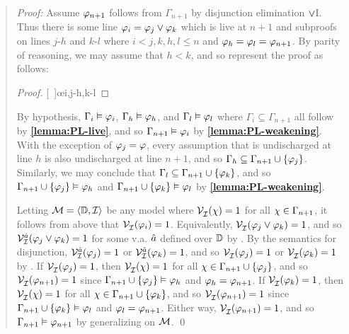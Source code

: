 \begin{quote} 
  \textit{Proof:} Assume $\varphi_{n+1}$ follows from $\Gamma_{n+1}$ by disjunction elimination $\vee$I.
  Thus there is some line $\varphi_i=\varphi_j\vee\varphi_k$ which is live at $n+1$ and subproofs on lines $j$-$h$ and $k$-$l$ where $i<j,k,h,l\leq n$ and $\varphi_h=\varphi_l=\varphi_{n+1}$.
  By parity of reasoning, we may assume that $h<k$, and so represent the proof as follows:

  \begin{proof}
  \open
     
  \close
  \open
     
  \close
  [\ ]{\metaC}\oe{i,j-h,k-l} 
  \end{proof}

  By hypothesis, $\Gamma_i\vDash \varphi_i$, $\Gamma_h\vDash \varphi_h$, and $\Gamma_l\vDash \varphi_l$ where $\Gamma_i\subseteq \Gamma_{n+1}$ all follow by \textbf{\ref{lemma:PL-live}}, and so $\Gamma_{n+1} \vDash \varphi_i$ by \textbf{\ref{lemma:PL-weakening}}.
  With the exception of $\varphi_j=\varphi$, every assumption that is undischarged at line $h$ is also undischarged at line $n+1$, and so $\Gamma_h\subseteq\Gamma_{n+1}\cup\lbrace\varphi_j\rbrace$.
  Similarly, we may conclude that $\Gamma_l\subseteq\Gamma_{n+1}\cup\lbrace\varphi_k\rbrace$, and so $\Gamma_{n+1}\cup\lbrace\varphi_j\rbrace \vDash \varphi_h$ and $\Gamma_{n+1}\cup\lbrace\varphi_k\rbrace \vDash \varphi_l$ by \textbf{\ref{lemma:PL-weakening}}.


  Letting $\mathcal{M}=\langle\mathbb{D},\mathcal{I}\rangle$ be any model where $\mathcal{V}_{\mathcal{I}}^{}(\chi) = 1$ for all $\chi \in \Gamma_{n+1}$, it follows from above that $\mathcal{V}_{\mathcal{I}}^{}(\varphi_i) = 1$.
  Equivalently, $\mathcal{V}_{\mathcal{I}}^{}(\varphi_j \vee \varphi_k) = 1$, and so $\mathcal{V}_{\mathcal{I}}^{\hat{a}}(\varphi_j\vee\varphi_k)=1$ for some v.a. $\hat{a}$ defined over $\mathbb{D}$ by .
  By the semantics for disjunction, $\mathcal{V}_{\mathcal{I}}^{\hat{a}}(\varphi_j)=1$ or $\mathcal{V}_{\mathcal{I}}^{\hat{a}}(\varphi_k)=1$, and so $\mathcal{V}_{\mathcal{I}}^{}(\varphi_j)=1$ or $\mathcal{V}_{\mathcal{I}}^{}(\varphi_k)=1$ by .
  If $\mathcal{V}_{\mathcal{I}}^{}(\varphi_j)=1$, then $\mathcal{V}_{\mathcal{I}}^{}(\chi)=1$ for all $\chi \in \Gamma_{n+1}\cup\lbrace\varphi_j\rbrace$, and so $\mathcal{V}_{\mathcal{I}}^{}(\varphi_{n+1})=1$ since $\Gamma_{n+1}\cup\lbrace\varphi_j\rbrace \vDash \varphi_h$ and $\varphi_h=\varphi_{n+1}$. 
  If $\mathcal{V}_{\mathcal{I}}^{}(\varphi_k)=1$, then $\mathcal{V}_{\mathcal{I}}^{}(\chi)=1$ for all $\chi \in \Gamma_{n+1}\cup\lbrace\varphi_k\rbrace$, and so $\mathcal{V}_{\mathcal{I}}^{}(\varphi_{n+1})=1$ since $\Gamma_{n+1}\cup\lbrace\varphi_k\rbrace \vDash \varphi_l$ and $\varphi_l=\varphi_{n+1}$.
  Either way, $\mathcal{V}_{\mathcal{I}}^{}(\varphi_{n+1})=1$, and so $\Gamma_{n+1} \vDash \varphi_{n+1}$ by generalizing on $\mathcal{M}$.
  \qed
\end{quote}

